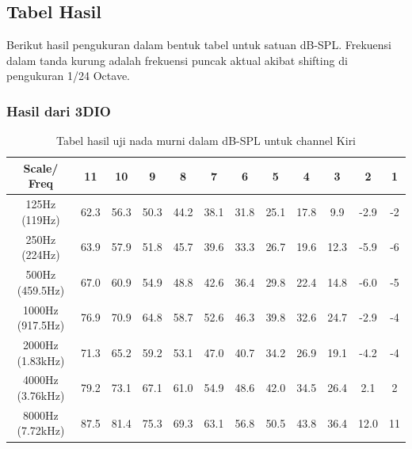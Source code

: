 \documentclass{article}
\begin{document}
	\subsection{Tabel Hasil}

	Berikut hasil pengukuran dalam bentuk tabel untuk satuan dB-SPL.
	Frekuensi dalam tanda kurung adalah frekuensi puncak aktual akibat shifting di pengukuran 1/24 Octave.

	\subsubsection{Hasil dari 3DIO}

	\begin{table}[H]
		\renewcommand{\tablename}{Tabel}
		\caption{Tabel hasil uji nada murni dalam dB-SPL untuk channel Kiri}
		\centering
		\begin{tabular}{|c|c|c|c|c|c|c|c|c|c|c|c|}
			\hline
			Scale/ Freq & 11 & 10 & 9 & 8 & 7 & 6 & 5 & 4 & 3 & 2 & 1\\ [0.5ex]
			\hline\hline
			125Hz (119Hz) & 62.3 & 56.3 & 50.3  & 44.2 & 38.1 & 31.8 & 25.1 & 17.8 & 9.9 & -2.9 & -2 \\
			250Hz (224Hz) & 63.9 & 57.9 & 51.8  & 45.7 & 39.6 & 33.3 & 26.7 & 19.6 & 12.3 & -5.9 & -6 \\
			500Hz (459.5Hz) & 67.0 & 60.9 & 54.9  & 48.8 & 42.6 & 36.4 & 29.8 & 22.4 & 14.8 & -6.0 & -5 \\
			1000Hz (917.5Hz) & 76.9 & 70.9 & 64.8  & 58.7 & 52.6 & 46.3 & 39.8 & 32.6 & 24.7 & -2.9 & -4 \\
			2000Hz (1.83kHz) & 71.3 & 65.2 & 59.2  & 53.1 & 47.0 & 40.7 & 34.2 & 26.9 & 19.1 & -4.2 & -4 \\
			4000Hz (3.76kHz) & 79.2 & 73.1 & 67.1  & 61.0 & 54.9 & 48.6 & 42.0 & 34.5 & 26.4 & 2.1 & 2 \\
			8000Hz (7.72kHz) & 87.5 & 81.4 & 75.3  & 69.3 & 63.1 & 56.8 & 50.5 & 43.8 & 36.4 & 12.0 & 11 \\
			\hline
		\end{tabular}
	\end{table}
\end{document}
